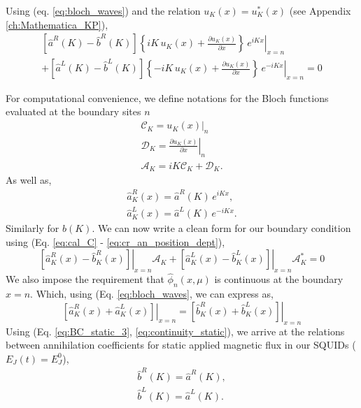 %
Using (eq. \ref{eq:bloch_waves}) and the relation $u_K(x) = u^*_K(x)$ (see Appendix \ref{ch:Mathematica_KP}),
%
\begin{equation}\label{eq:BC_static_2}
\begin{split}
    \left[\hat{a}^R(K) - \hat{b}^R(K)\right]
    \left.
    \left\lbrace
    i K \, u_K(x) + \frac{\partial u_K(x)}{\partial x}
    \right\rbrace
    \,e^{i K x}
    \right|_{x=n}
    \\[2mm]
    +
    \left[\hat{a}^L(K) - \hat{b}^L(K)\right]
    \left.
    \left\lbrace
    -i K\, u_K(x) + \frac{\partial u_K(x)}{\partial x}
    \right\rbrace
    \,e^{-i K x} 
    \right|_{x=n}
    = 0 
\end{split}
\end{equation}
%




For computational convenience, we define notations for the Bloch functions evaluated at the boundary sites $n$
%
\begin{gather}
    \mathcal{C}_K = \left.u_K(x)\right|_{n}
    \label{eq:cal_C}\\
    \mathcal{D}_K = \left.\frac{\partial u_K(x)}{\partial x}\right|_{n}
    \label{eq:cal_D}\\
    \mathcal{A}_K = iK\mathcal{C}_K + \mathcal{D}_K.
    \label{eq:cal_A}
\end{gather}
%
As well as, 
\begin{subequations}\label{eq:cr_an_position_dept}
\begin{eqnarray}
    \hat{a}^R_K(x) = \hat{a}^R(K)\,e^{i K x},
    \\
    \hat{a}^L_K(x) = \hat{a}^L(K)\,e^{-i K x}. 
\end{eqnarray}
\end{subequations}
%
Similarly for $\hat{b}(K)$. We can now write a clean form for our boundary condition using (Eq. \ref{eq:cal_C} - \ref{eq:cr_an_position_dept}),
%
\begin{equation}\label{eq:BC_static_3}
    \left.\left[\hat{a}^R_K(x) - \hat{b}_K^R(x)\right]\right|_{x=n} \mathcal{A}_K
    +
    \left.\left[\hat{a}^L_K(x) - \hat{b}^L_K(x)\right]\right|_{x=n}\mathcal{A}^*_K = 0 
\end{equation}
%
We also impose the requirement that $\hat{\phi}_n(x,\mu)$ is continuous at the boundary $x=n$. Which, using (Eq. \ref{eq:bloch_waves}, we can express as,
%
\begin{equation}\label{eq:continuity_static}
    \left.\left[\hat{a}^R_K(x) + \hat{a}^L_K(x)\right]\right|_{x=n}
    =
    \left.\left[\hat{b}^R_K(x) + \hat{b}^L_K(x)\right]\right|_{x=n}
\end{equation}
%
Using (Eq. \ref{eq:BC_static_3}, \ref{eq:continuity_static}), we arrive at the relations between annihilation coefficients for static applied magnetic flux in our SQUIDs ($E_J(t)= E^0_J$),
%
\begin{subequations}\label{eq:static_solutions}
\begin{eqnarray}
    \hat{b}^R(K) = \hat{a}^R(K),
    \\
    \hat{b}^L(K) = \hat{a}^L(K).
\end{eqnarray}
\end{subequations}
%


